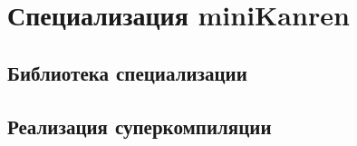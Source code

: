 \section{Специализация miniKanren}
\label{sec:scmk}


\subsection{Библиотека специализации}



\subsection{Реализация суперкомпиляции}


